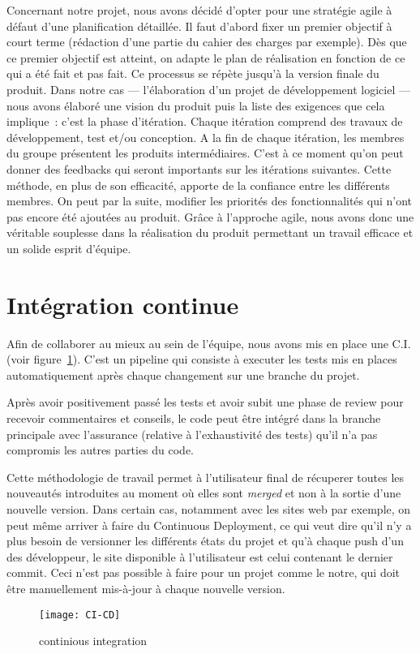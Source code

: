 Concernant notre projet, nous avons décidé d’opter pour une stratégie agile à
défaut d’une planification détaillée. Il faut d’abord fixer un premier objectif
à court terme (rédaction d’une partie du cahier des charges par exemple). Dès
que ce premier objectif est atteint, on adapte le plan de réalisation en
fonction de ce qui a été fait et pas fait. Ce processus se répète jusqu’à la
version finale du produit.
Dans notre cas --- l’élaboration d’un projet de développement logiciel --- nous
avons élaboré une vision du produit puis la liste des exigences que cela
implique : c’est la phase d’itération. Chaque itération comprend des travaux
de développement, test et/ou conception. A la fin de chaque itération, les membres
du groupe présentent les produits intermédiaires. C’est à ce moment qu’on peut
donner des feedbacks qui seront importants sur les itérations suivantes. Cette
méthode, en plus de son efficacité, apporte de la confiance entre les
différents membres.
On peut par la suite, modifier les priorités des fonctionnalités qui n’ont pas
encore été ajoutées au produit.
Grâce à l’approche agile, nous avons donc une  véritable souplesse dans la
réalisation du produit permettant un travail efficace et un solide esprit
d’équipe.

\section{Intégration continue}
Afin de collaborer au mieux au sein de l'équipe, nous avons mis en place
une C.I. (voir figure~\ref{fig:ci}). C'est un pipeline qui consiste à executer
les tests mis en places automatiquement après chaque changement sur une branche
du projet.
\vspace{0.5cm}

Après avoir positivement passé les tests et avoir subit une phase de review
pour recevoir commentaires et conseils, le code peut être intégré dans la
branche principale avec l'assurance (relative à l’exhaustivité des tests) qu'il
n'a pas compromis les autres parties du code.
\vspace{0.5cm}

Cette méthodologie de travail permet à l’utilisateur final de récuperer toutes
les nouveautés introduites au moment où elles sont \emph{merged} et non à la
sortie d’une nouvelle version. Dans certain cas, notamment avec les sites web
par exemple, on peut même arriver à faire du Continuous Deployment, ce qui veut
dire qu’il n’y a plus besoin de versionner les différents états du projet et
qu’à chaque push d’un des développeur, le site disponible à l’utilisateur est
celui contenant le dernier commit. Ceci n'est pas possible à faire pour un
projet comme le notre, qui doit être manuellement mis-à-jour à chaque nouvelle
version.

\begin{figure}[h]\label{fig:ci}
  \texttt{[image: CI-CD]}
  \caption{continious integration}
\end{figure}
